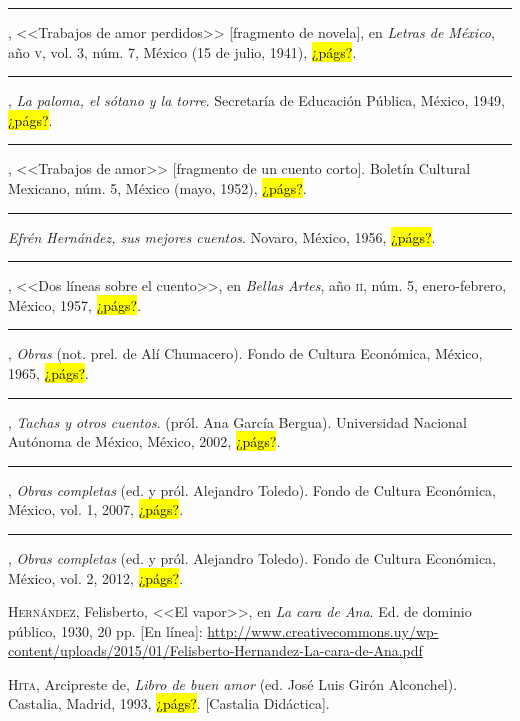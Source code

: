 \documentclass[14pt,twoside,final]{extbook} %
\begin{document}
\rule{1cm}{0.4pt}, <<Trabajos de amor perdidos>> [fragmento de novela], en \emph{Letras de México}, año \textsc{v}, vol. 3, núm. 7, México (15 de julio, 1941), \hl{¿págs?}.\label{bib:hernandez1941}

\rule{1cm}{0.4pt}, \emph{La paloma, el sótano y la torre}. Secretaría de Educación Pública, México, 1949, \hl{¿págs?}.\label{bib:hernandez1949}

\rule{1cm}{0.4pt}, <<Trabajos de amor>> [fragmento de un cuento corto]. Boletín Cultural Mexicano, núm. 5, México (mayo, 1952), \hl{¿págs?}.\label{bib:hernandez1952}

\rule{1cm}{0.4pt} \emph{Efrén Hernández, sus mejores cuentos}. Novaro, México, 1956, \hl{¿págs?}.\label{bib:hernandez1956}

\rule{1cm}{0.4pt}, <<Dos líneas sobre el cuento>>, en \emph{Bellas Artes}, año \textsc{ii}, núm. 5, enero-febrero, México, 1957, \hl{¿págs?}.\label{bib:hernandez1957}

\rule{1cm}{0.4pt}, \emph{Obras} (not. prel. de Alí Chumacero). Fondo de Cultura Económica, México, 1965, \hl{¿págs?}.\label{bib:hernandez1965}

\rule{1cm}{0.4pt}, \emph{Tachas y otros cuentos}. (pról. Ana García Bergua). Universidad Nacional Autónoma de México, México, 2002, \hl{¿págs?}.\label{bib:hernandez2002}

\rule{1cm}{0.4pt}, \emph{Obras completas} (ed. y pról. Alejandro Toledo). Fondo de Cultura Económica, México, vol. 1, 2007, \hl{¿págs?}.\label{bib:hernandez2007}

\rule{1cm}{0.4pt}, \emph{Obras completas} (ed. y pról. Alejandro Toledo). Fondo de Cultura Económica, México, vol. 2, 2012, \hl{¿págs?}.\label{bib:hernandez2012}

\textsc{Hernández}, Felisberto, <<El vapor>>, en \emph{La cara de Ana}. Ed. de dominio público, 1930, 20 pp. [En línea]: \href{http://www.creativecommons.uy/wp-content/uploads/2015/01/Felisberto-Hernandez-La-cara-de-Ana.pdf}{http://www.creativecommons.uy/wp-content/uploads/2015/01/Felisberto-Hernandez-La-cara-de-Ana.pdf}

\textsc{Hita}, Arcipreste de, \emph{Libro de buen amor} (ed. José Luis Girón Alconchel). Castalia, Madrid, 1993, \hl{¿págs?}. [Castalia Didáctica].\label{bib:hita1993}
\end{document}
